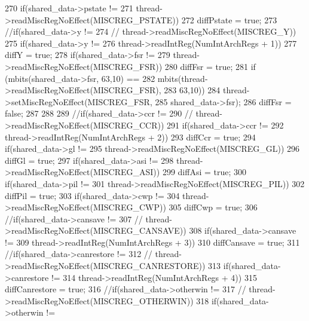 \begin{DoxyCode}
{{{{270                 if(shared_data->pstate !=
271                         thread->readMiscRegNoEffect(MISCREG_PSTATE))
272                     diffPstate = true;
273                 //if(shared_data->y !=
274                 //        thread->readMiscRegNoEffect(MISCREG_Y))
275                 if(shared_data->y !=
276                         thread->readIntReg(NumIntArchRegs + 1))
277                     diffY = true;
278                 if(shared_data->fsr !=
279                         thread->readMiscRegNoEffect(MISCREG_FSR)) {
280                     diffFsr = true;
281                     if (mbits(shared_data->fsr, 63,10) ==
282                             mbits(thread->readMiscRegNoEffect(MISCREG_FSR),
283                                 63,10)) {
284                         thread->setMiscRegNoEffect(MISCREG_FSR,
285                                 shared_data->fsr);
286                         diffFsr = false;
287                     }
288                 }
289                 //if(shared_data->ccr !=
290                 //        thread->readMiscRegNoEffect(MISCREG_CCR))
291                 if(shared_data->ccr !=
292                         thread->readIntReg(NumIntArchRegs + 2))
293                     diffCcr = true;
294                 if(shared_data->gl !=
295                         thread->readMiscRegNoEffect(MISCREG_GL))
296                     diffGl = true;
297                 if(shared_data->asi !=
298                         thread->readMiscRegNoEffect(MISCREG_ASI))
299                     diffAsi = true;
300                 if(shared_data->pil !=
301                         thread->readMiscRegNoEffect(MISCREG_PIL))
302                     diffPil = true;
303                 if(shared_data->cwp !=
304                         thread->readMiscRegNoEffect(MISCREG_CWP))
305                     diffCwp = true;
306                 //if(shared_data->cansave !=
307                 //        thread->readMiscRegNoEffect(MISCREG_CANSAVE))
308                 if(shared_data->cansave !=
309                         thread->readIntReg(NumIntArchRegs + 3))
310                     diffCansave = true;
311                 //if(shared_data->canrestore !=
312                 //        thread->readMiscRegNoEffect(MISCREG_CANRESTORE))
313                 if(shared_data->canrestore !=
314                         thread->readIntReg(NumIntArchRegs + 4))
315                     diffCanrestore = true;
316                 //if(shared_data->otherwin !=
317                 //        thread->readMiscRegNoEffect(MISCREG_OTHERWIN))
318                 if(shared_data->otherwin !=
}}}}
\end{DoxyCode}
